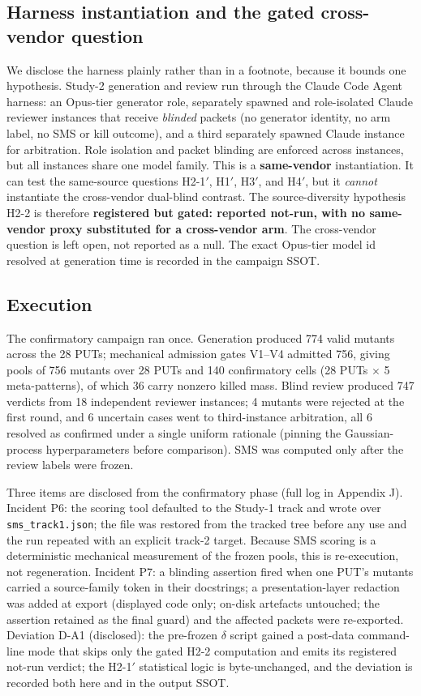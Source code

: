 \documentclass[manuscript,screen,review]{acmart}
\begin{document}
\subsection{Harness instantiation and the gated cross-vendor
question}\label{study2-harness}

We disclose the harness plainly rather than in a footnote, because it
bounds one hypothesis. Study-2 generation and review run through the
Claude Code Agent harness: an Opus-tier generator role, separately
spawned and role-isolated Claude reviewer instances that receive
\emph{blinded} packets (no generator identity, no arm label, no SMS or
kill outcome), and a third separately spawned Claude instance for
arbitration. Role isolation and packet blinding are enforced across
instances, but all instances share one model family. This is a
\textbf{same-vendor} instantiation. It can test the same-source
questions H2-1\('\), H1\('\), H3\('\), and H4\('\), but it
\emph{cannot} instantiate the cross-vendor dual-blind contrast. The
source-diversity hypothesis H2-2 is therefore \textbf{registered but
gated: reported not-run, with no same-vendor proxy substituted for a
cross-vendor arm}. The cross-vendor question is left open, not reported
as a null. The exact Opus-tier model id resolved at generation time is
recorded in the campaign SSOT.

\subsection{Execution}\label{study2-execution}

The confirmatory campaign ran once. Generation produced 774 valid
mutants across the 28 PUTs; mechanical admission gates V1--V4 admitted
756, giving pools of 756 mutants over 28 PUTs and 140 confirmatory cells
(28 PUTs \(\times\) 5 meta-patterns), of which 36 carry nonzero killed
mass. Blind review produced 747 verdicts from 18 independent reviewer
instances; 4 mutants were rejected at the first round, and 6 uncertain
cases went to third-instance arbitration, all 6 resolved as confirmed
under a single uniform rationale (pinning the Gaussian-process
hyperparameters before comparison). SMS was computed only after the
review labels were frozen.

Three items are disclosed from the confirmatory phase (full log in
Appendix J). Incident P6: the scoring
tool defaulted to the Study-1 track and wrote over
\texttt{sms\_track1.json}; the file was restored from the tracked tree
before any use and the run repeated with an explicit track-2 target.
Because SMS scoring is a deterministic mechanical measurement of the
frozen pools, this is re-execution, not regeneration. Incident P7: a
blinding assertion fired when one PUT's mutants carried a source-family
token in their docstrings; a presentation-layer redaction was added at
export (displayed code only; on-disk artefacts untouched; the assertion
retained as the final guard) and the affected packets were re-exported.
Deviation D-A1 (disclosed): the pre-frozen \(\delta\) script gained a
post-data command-line mode that skips only the gated H2-2 computation
and emits its registered not-run verdict; the H2-1\('\) statistical
logic is byte-unchanged, and the deviation is recorded both here and in
the output SSOT.
\end{document}
